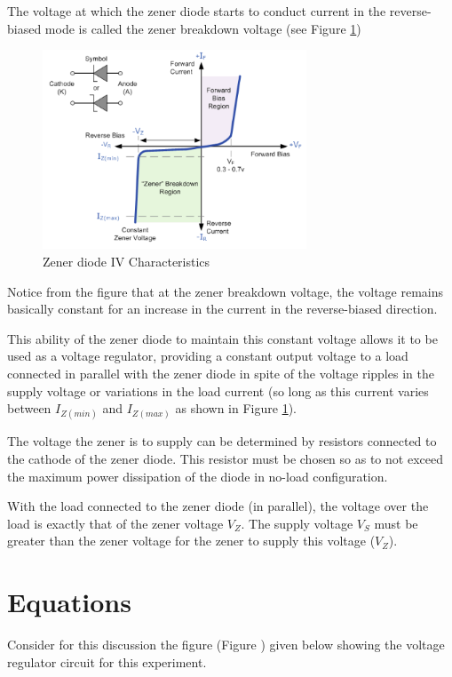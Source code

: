 \documentclass[12pt, a4paper]{article}
\begin{document}
		The voltage at which the zener diode starts to conduct current in the reverse-biased mode is called the zener breakdown voltage (see Figure \ref{fig:zener_iv_curve})

		\begin{figure}[H]
			\centering
			\includegraphics[width=0.7\textwidth]{Images/Zener_IV_Curve.png}
			\caption{Zener diode IV Characteristics}
			\label{fig:zener_iv_curve}
		\end{figure}

		Notice from the figure that at the zener breakdown voltage, the voltage remains basically constant for an increase in the current in the reverse-biased direction.

		This ability of the zener diode to maintain this constant voltage allows it to be used as a voltage regulator, providing a constant output voltage to a load connected in parallel with the zener diode in spite of the voltage ripples in the supply voltage or variations in the load current (so long as this current varies between $I_{Z(min)}$ and $I_{Z(max)}$ as shown in Figure \ref{fig:zener_iv_curve}).

		The voltage the zener is to supply can be determined by resistors connected to the cathode of the zener diode. This resistor must be chosen so as to not exceed the maximum power dissipation of the diode in no-load configuration.

		With the load connected to the zener diode (in parallel), the voltage over the load is exactly that of the zener voltage $V_Z$. The supply voltage $V_S$ must be greater than the zener voltage for the zener to supply this voltage ($V_Z$).

	\section{Equations} %
	\label{sec:equations}
		Consider for this discussion the figure (Figure ) given below showing the voltage regulator circuit for this experiment.
\end{document}
